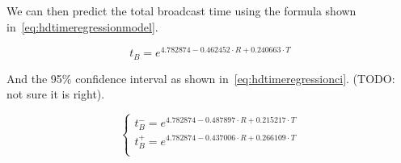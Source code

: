 We can then predict the total broadcast time using the formula shown
in~\eqref{eq:hdtimeregressionmodel}.

\begin{equation}\label{eq:hdtimeregressionmodel}
	t_B = e^{4.782874 - 0.462452 \cdot R + 0.240663 \cdot T}
\end{equation}

And the 95\% confidence interval as shown in~\eqref{eq:hdtimeregressionci}.
(TODO\@: not sure it is right).

\begin{equation}\label{eq:hdtimeregressionci}
	\begin{cases}
		t^-_B = e^{4.782874 - 0.487897 \cdot R + 0.215217 \cdot T}\\
		t^+_B = e^{4.782874 - 0.437006 \cdot R + 0.266109 \cdot T}\\
	\end{cases}
\end{equation}
